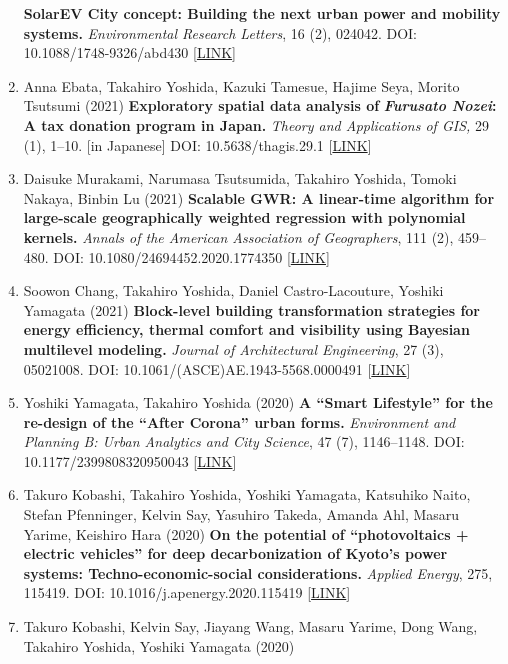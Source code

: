\documentclass[
]{book}
\begin{document}
\begin{enumerate}
  \textbf{SolarEV City concept: Building the next urban power and mobility systems.}
  \emph{Environmental Research Letters}, 16 (2), 024042.
  DOI: 10.1088/1748-9326/abd430 {[}\href{https://doi.org/10.1088/1748-9326/abd430}{LINK}{]}
\item
  Anna Ebata, Takahiro Yoshida, Kazuki Tamesue, Hajime Seya, Morito Tsutsumi (2021)
  \textbf{Exploratory spatial data analysis of} \textbf{\emph{Furusato Nozei}: A tax donation program in Japan.}
  \emph{Theory and Applications of GIS,} 29 (1), 1--10. {[}in Japanese{]}
  DOI: 10.5638/thagis.29.1 {[}\href{https://www.jstage.jst.go.jp/article/thagis/29/1/29_1/_article/-char/en}{LINK}{]}
\item
  Daisuke Murakami, Narumasa Tsutsumida, Takahiro Yoshida, Tomoki Nakaya, Binbin Lu (2021)
  \textbf{Scalable GWR: A linear-time algorithm for large-scale geographically weighted regression with polynomial kernels.}
  \emph{Annals of the American Association of Geographers}, 111 (2), 459--480.
  DOI: 10.1080/24694452.2020.1774350 {[}\href{https://www.tandfonline.com/doi/full/10.1080/24694452.2020.1774350}{LINK}{]}
\item
  Soowon Chang, Takahiro Yoshida, Daniel Castro-Lacouture, Yoshiki Yamagata (2021) \textbf{Block-level building transformation strategies for energy efficiency, thermal comfort and visibility using Bayesian multilevel modeling.}
  \emph{Journal of Architectural Engineering}, 27 (3), 05021008.
  DOI: 10.1061/(ASCE)AE.1943-5568.0000491 {[}\href{https://ascelibrary.org/doi/abs/10.1061/\%28ASCE\%29AE.1943-5568.0000491}{LINK}{]}
\item
  Yoshiki Yamagata, Takahiro Yoshida (2020)
  \textbf{A ``Smart Lifestyle'' for the re-design of the ``After Corona'' urban forms.}
  \emph{Environment and Planning B: Urban Analytics and City Science}, 47 (7), 1146--1148.
  DOI: 10.1177/2399808320950043 {[}\href{http://dx.doi.org/10.1177/2399808320950043}{LINK}{]}
\item
  Takuro Kobashi, Takahiro Yoshida, Yoshiki Yamagata, Katsuhiko Naito, Stefan Pfenninger, Kelvin Say, Yasuhiro Takeda, Amanda Ahl, Masaru Yarime, Keishiro Hara (2020)
  \textbf{On the potential of ``photovoltaics + electric vehicles'' for deep decarbonization of Kyoto's power systems: Techno-economic-social considerations.}
  \emph{Applied Energy}, 275, 115419.
  DOI: 10.1016/j.apenergy.2020.115419 {[}\href{https://doi.org/10.1016/j.apenergy.2020.115419}{LINK}{]}
\item
  Takuro Kobashi, Kelvin Say, Jiayang Wang, Masaru Yarime, Dong Wang, Takahiro Yoshida, Yoshiki Yamagata (2020)

\end{enumerate}
\end{document}
